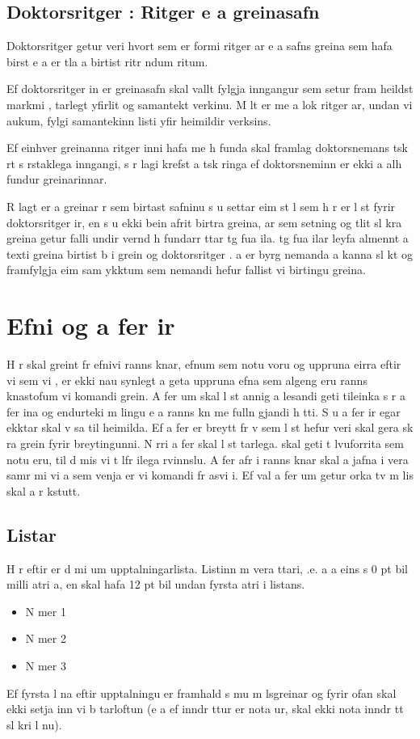 \documentclass{article}
\begin{document}
\section{Doktorsritger : Ritger  e a greinasafn}
Doktorsritger  getur veri  hvort sem er   formi ritger ar e a safns greina sem hafa birst e a  er  tla  a  birtist   ritr ndum ritum. 

Ef doktorsritger in er greinasafn skal  vallt fylgja inngangur sem setur fram heildst  markmi ,  tarlegt yfirlit og samantekt   verkinu. M lt er me  a    lok ritger ar,   undan vi aukum, fylgi samantekinn listi yfir heimildir verksins.

Ef einhver greinanna   ritger inni hafa me h funda skal framlag doktorsnemans  tsk rt s rstaklega   inngangi, s r   lagi krefst  a   tsk ringa ef doktorsneminn er ekki a alh fundur greinarinnar. 

R lagt er a  greinar  r sem birtast   safninu s u settar    eim st l sem h r er l st fyrir doktorsritger ir, en s u ekki bein afrit birtra greina,  ar sem setning og  tlit sl kra greina getur falli  undir vernd h fundarr ttar  tg fua ila.  tg fua ilar leyfa almennt a  texti greina birtist b i   grein og doktorsritger .  a  er    byrg  nemanda a  kanna sl kt og framfylgja  eim sam ykktum sem nemandi hefur fallist   vi  birtingu greina.
 
\chapter{Efni og a fer ir}
H r skal greint fr  efnivi  ranns knar, efnum sem notu  voru og uppruna  eirra eftir  vi sem vi   ,   er ekki nau synlegt a  geta uppruna efna sem algeng eru   ranns knastofum   vi komandi grein. A fer um skal l st  annig a  lesandi geti tileinka  s r a fer ina og endurteki  m lingu e a ranns kn me  fulln gjandi h tti. S u a fer ir  egar  ekktar skal v sa  til heimilda. Ef a fer  er breytt fr   v  sem l st hefur veri  skal gera sk ra grein fyrir breytingunni. N rri a fer  skal l st  tarlega.   skal geti  t lvuforrita sem notu  eru, til d mis vi  t lfr ilega  rvinnslu. A fer afr i ranns knar skal a  jafna i vera   samr mi vi   a  sem venja er   vi komandi fr asvi i. Ef val   a fer um getur orka  tv m lis skal  a  r kstutt.

\section{Listar}
H r   eftir er d mi um upptalningarlista. Listinn m  vera  ttari,  .e. a  a eins s  0 pt bil   milli atri a, en   skal hafa 12 pt bil   undan fyrsta atri i listans.
\begin{itemize}
 \item N mer 1
 \item N mer 2
 \item N mer 3
\end{itemize}
Ef fyrsta l na eftir upptalningu er framhald s mu m lsgreinar og fyrir ofan skal ekki setja inn vi b tarloftun (e a ef inndr ttur er nota ur, skal ekki nota inndr tt   sl kri l nu). 
\end{document}
